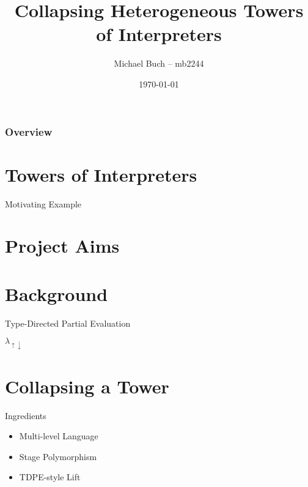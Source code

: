 \documentclass{beamer}
\title{Collapsing Heterogeneous Towers of Interpreters}
\author[mb2244]{Michael Buch -- mb2244}
\institute
{
University of Cambridge\\ %
\medskip
}
\date{\today} %
\begin{document}
\begin{frame}
\titlepage %
\end{frame}

\begin{frame}
\frametitle{Overview} %
\tableofcontents %
\end{frame}


\newcommand{\mslang}{$\lambda_{\uparrow\downarrow}$}



\section{Towers of Interpreters}
\begin{frame}{Motivating Example}
\end{frame}
\section{Project Aims}
\section{Background}
\begin{frame}{Type-Directed Partial Evaluation}
\end{frame}
\begin{frame}{\texorpdfstring{\mslang}{}}
\end{frame}
\section{Collapsing a Tower}
\begin{frame}{Ingredients}
    \begin{itemize}
        \item Multi-level Language
        \item Stage Polymorphism
        \item TDPE-style Lift
    \end{itemize}
\end{frame}
\end{document}
